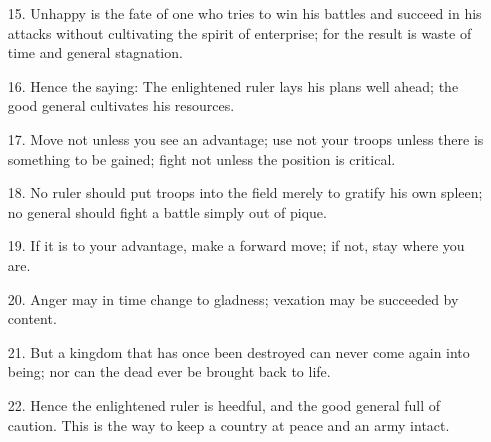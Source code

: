 \documentclass[11pt,openany]{memoir}
\newcommand{\enumeratemargin}{1.30em}
\begin{document}
\begin{enumerate}[leftmargin=\enumeratemargin]
\item[15.] Unhappy is the fate of one who tries to win his battles and succeed in his attacks without cultivating the spirit of enterprise; for the result is waste of time and general stagnation.
\item[16.] Hence the saying: The enlightened ruler lays his plans well ahead; the good general cultivates his resources.
\item[17.] Move not unless you see an advantage; use not your troops unless there is something to be gained; fight not unless the position is critical.
\item[18.] No ruler should put troops into the field merely to gratify his own spleen; no general should fight a battle simply out of pique.
\item[19.] If it is to your advantage, make a forward move; if not, stay where you are.
\item[20.] Anger may in time change to gladness; vexation may be succeeded by content.
\item[21.] But a kingdom that has once been destroyed can never come again into being; nor can the dead ever be brought back to life.
\item[22.] Hence the enlightened ruler is heedful, and the good general full of caution. This is the way to keep a country at peace and an army intact.
\end{enumerate}
\end{document}
